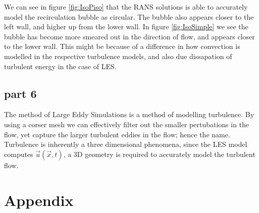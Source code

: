 \documentclass[paper=a4, fontsize=11pt]{article} %
\numberwithin{equation}{section} %
\numberwithin{figure}{section} %
\numberwithin{table}{section} %
\begin{document}
    We can see in figure \ref{fig:IsoPiso} that the RANS solutions is able to accurately model the recirculation bubble as circular. The bubble also appears closer to the left wall, and higher up from the lower wall. In figure \ref{fig:IsoSimple} we see the bubble has become more smeared out in the direction of flow, and appears closer to the lower wall. This might be because of a difference in how convection is modelled in the respective turbulence models, and also due dissapation of turbulent energy in the case of LES.

    \subsection*{part 6}
    The method of Large Eddy Simulations is a method of modelling turbulence. By using a corser mesh we can effectively filter out the smaller pertubations in the flow, yet capture the larger turbulent eddies in the flow; hence the name. Turbulence is inherently a three dimensional phenomena, since the LES model computes $\overrightarrow{u}(\overrightarrow{x}, t)$, a 3D geometry is required to accurately model the turbulent flow.
    \clearpage
    \section{Appendix}
\end{document}
